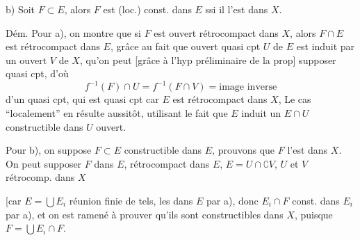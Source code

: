 b) Soit $F\subset E$,  alors $F$ est (loc.) const. dans $E$ ssi il l'est dans $X$.


Dém. Pour a), on montre que si $F$ est ouvert rétrocompact dans $X$, alors $F\cap E$ est rétrocompact dans $E$, grâce au fait que \unsure{$\forall$} ouvert quasi cpt $U$ de $E$ est induit par un ouvert $V$ de $X$, qu'on peut  [grâce à l'hyp préliminaire de la prop] supposer quasi cpt, d'où
\[
f^{-1}(F)\cap U=f^{-1}(F\cap V)=\text{image inverse}
\]
d'un quasi cpt, qui est quasi cpt car $E$ est rétrocompact dans $X$,   Le cas ``localement'' en résulte aussitôt, utilisant le fait que $E$ induit un $E\cap U$ constructible dans  $U$ ouvert.


Pour b), on suppose $F\subset E$ constructible dans \uline{$E$},  prouvons que $F$ l'est dans $X$. On peut supposer $F$  dans $E$, rétrocompact dans $E$,  $E=U\cap\complement V$, $U$ et $V$ rétrocomp. dans $X$ 

[car $E=\bigcup E_i$ réunion finie de tels, les  dans \uline{$E$} par a), donc $E_i\cap F$ const. dans $E_i$ par a), et on est ramené à prouver qu'ils sont constructibles dans $X$, puisque $F=\bigcup E_i\cap F$.




